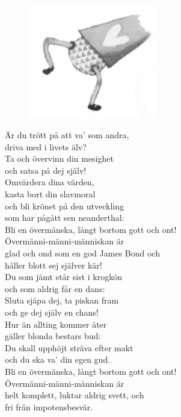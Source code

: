 \documentclass[a6paper, 10pt, twoside]{article}
\begin{document}
\vspace{35pt}
\begin{figure}[!h]
\centering
\includegraphics[width=0.5\textwidth]{lingonben.png}
\end{figure}

\begin{center}
\end{center}
\begin{lyrics}
\small Är du trött på att va' som andra,\\ 
driva med i livets älv?\\ 
Ta och övervinn din mesighet\\ 
och satsa på dej själv!
\vspace{5pt}\\ 
Omvärdera dina värden,\\ 
kasta bort din slavmoral\\ 
och bli krönet på den utveckling\\ 
som har pågått sen neanderthal:
 \vspace{5pt}\\ 
Bli en övermänska, långt bortom gott och ont!\\ 
Övermänni-männi-människan är\\ 
glad och ond som en god James Bond och\\ 
håller blott sej själver kär!
\vspace{5pt}\\  
Du som jämt står sist i krogkön\\ 
och som aldrig får en dans:\\ 
Sluta sjåpa dej, ta piskan fram\\ 
och ge dej själv en chans!
\vspace{5pt}\\  
Hur än allting kommer åter\\ 
gäller blonda bestars bud:\\ 
Du skall upphöjt sträva efter makt\\ 
och du ska va' din egen gud.
\vspace{5pt}\\  
Bli en övermänska, långt bortom gott och ont!\\ 
Övermänni-männi-människan är\\ 
helt komplett, luktar aldrig svett, och\\ 
fri från impotensbesvär.
\end{lyrics}
\end{document}
